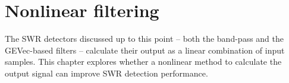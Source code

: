 \chapter{Nonlinear filtering}
\label{ch:RNN}

The SWR detectors discussed up to this point -- both the band-pass and the GEVec-based filters -- calculate their output as a linear combination of input samples. This chapter explores whether a nonlinear method to calculate the output signal can improve SWR detection performance.





